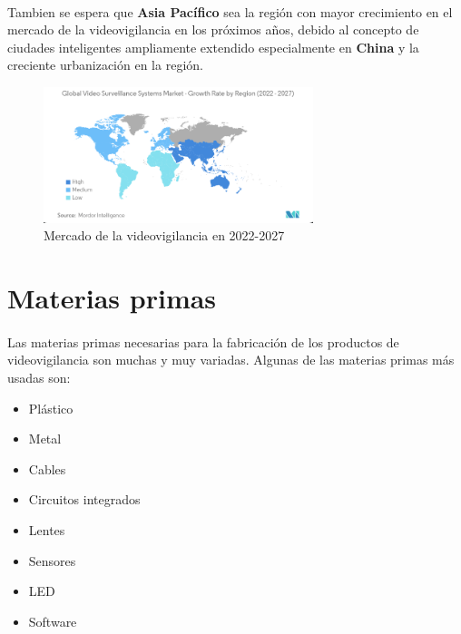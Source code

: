 \documentclass{report}
\begin{document}
        \paragraph*{}
        {
          Tambien se espera que \textbf{Asia Pacífico} sea la región con mayor crecimiento en el mercado de la videovigilancia en los próximos años, debido al concepto de ciudades inteligentes ampliamente extendido especialmente en \textbf{China} y la creciente urbanización en la región.\cite{mordor-video-surveillance}
        }
        \begin{figure}[H]
          \centering
          \includegraphics[width=0.7\textwidth]{./img/ssm.png}
          \caption{Mercado de la videovigilancia en 2022-2027}
        \end{figure}
      \section{Materias primas}
        \paragraph*{}{Las materias primas necesarias para la fabricación de los productos de videovigilancia son muchas y muy variadas. Algunas de las materias primas más usadas son:}
        \begin{multicols}{2}
          \begin{itemize}
            \item Plástico
            \item Metal
            \item Cables
            \item Circuitos integrados
            \item Lentes
            \item Sensores
            \item LED
            \item Software
          \end{itemize}
        \end{multicols}
\end{document}
